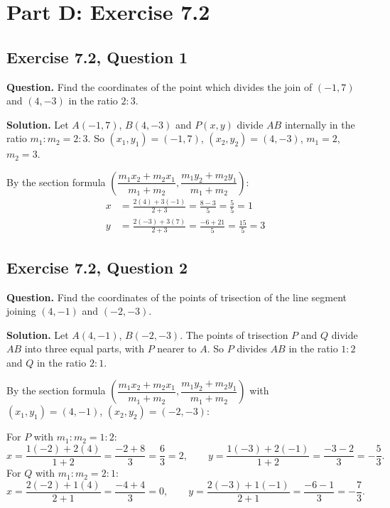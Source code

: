 \newpage
\section*{Part D: Exercise 7.2}

\subsection*{Exercise 7.2, Question 1}
\textbf{Question.} Find the coordinates of the point which divides the join of $(-1,7)$ and $(4,-3)$ in the ratio $2:3$.

\textbf{Solution.} Let $A(-1,7)$, $B(4,-3)$ and $P(x,y)$ divide $AB$ internally in the ratio $m_1:m_2=2:3$. So $(x_1,y_1)=(-1,7)$, $(x_2,y_2)=(4,-3)$, $m_1=2$, $m_2=3$.

By the section formula $\left(\dfrac{m_1x_2+m_2x_1}{m_1+m_2},\dfrac{m_1y_2+m_2y_1}{m_1+m_2}\right)$:
\begin{align*}
x&=\frac{2(4)+3(-1)}{2+3}=\frac{8-3}{5}=\frac{5}{5}=1\\
y&=\frac{2(-3)+3(7)}{2+3}=\frac{-6+21}{5}=\frac{15}{5}=3
\end{align*}


\subsection*{Exercise 7.2, Question 2}
\textbf{Question.} Find the coordinates of the points of trisection of the line segment joining $(4,-1)$ and $(-2,-3)$.

\textbf{Solution.} Let $A(4,-1)$, $B(-2,-3)$. The points of trisection $P$ and $Q$ divide $AB$ into three equal parts, with $P$ nearer to $A$. So $P$ divides $AB$ in the ratio $1:2$ and $Q$ in the ratio $2:1$.

By the section formula $\left(\dfrac{m_1x_2+m_2x_1}{m_1+m_2},\dfrac{m_1y_2+m_2y_1}{m_1+m_2}\right)$ with $(x_1,y_1)=(4,-1)$, $(x_2,y_2)=(-2,-3)$:

For $P$ with $m_1:m_2=1:2$:
\[
x=\frac{1(-2)+2(4)}{1+2}=\frac{-2+8}{3}=\frac63=2,\qquad y=\frac{1(-3)+2(-1)}{1+2}=\frac{-3-2}{3}=-\frac53 .
\]
For $Q$ with $m_1:m_2=2:1$:
\[
x=\frac{2(-2)+1(4)}{2+1}=\frac{-4+4}{3}=0,\qquad y=\frac{2(-3)+1(-1)}{2+1}=\frac{-6-1}{3}=-\frac73 .
\]

